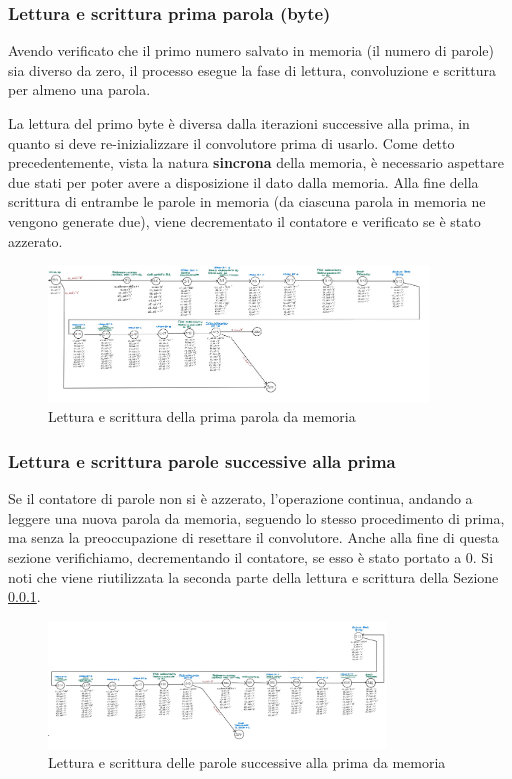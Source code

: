 \documentclass[12pt]{article} %
\begin{document}
			\subsubsection{Lettura e scrittura prima parola (byte)}
			\label{sec:LetturaScrittura_primaParola}
				Avendo verificato che il primo numero salvato in memoria (il numero di parole) sia diverso da zero,
				il processo esegue la fase di lettura, convoluzione e scrittura per almeno una parola.
				
				La lettura del primo byte è diversa dalla iterazioni successive alla prima, in quanto si deve
			    re-inizializzare il convolutore prima di usarlo. Come detto precedentemente, vista la natura
			    \textbf{sincrona} della memoria, è necessario aspettare due stati per poter avere
			    a disposizione il dato dalla memoria.
			    Alla fine della scrittura di entrambe le parole in memoria 
			    (da ciascuna parola in memoria ne vengono generate due), viene decrementato il contatore 
			    e verificato se è stato azzerato.
				\begin{figure}[h]
					\centering
					\includegraphics[width=0.9\textwidth]{FSM_letturabyte1.jpg}
					\caption{Lettura e scrittura della prima parola da memoria}
					\label{fig:FSM_letturabyte1}
				\end{figure}
			\subsubsection{Lettura e scrittura parole successive alla prima}
				Se il contatore di parole non si è azzerato, l'operazione continua, andando a leggere una 
				nuova parola da memoria, seguendo lo stesso procedimento di prima, ma senza 
				la preoccupazione di resettare il convolutore. Anche alla fine di questa sezione 
				verifichiamo, decrementando il contatore, se esso è stato portato
				a 0. Si noti che viene riutilizzata la seconda parte della lettura e 
				scrittura della Sezione \ref{sec:LetturaScrittura_primaParola}.
				\begin{figure}[h]
					\centering
					\includegraphics[width=0.8\textwidth]{FSM_letturabyte2.jpg}
					\caption{Lettura e scrittura delle parole successive alla prima da memoria}
					\label{fig:FSM_letturabyte2}
				\end{figure}
				\newpage
\end{document}
